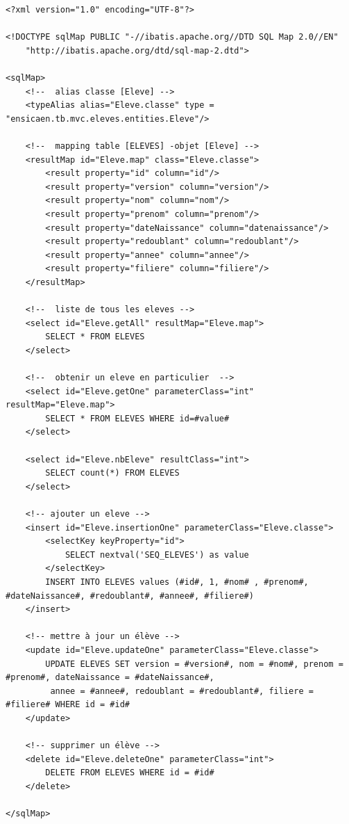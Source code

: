 \documentclass[a4paper,12pt]{article}
\begin{document}
\begin{lstlisting}
<?xml version="1.0" encoding="UTF-8"?>

<!DOCTYPE sqlMap PUBLIC "-//ibatis.apache.org//DTD SQL Map 2.0//EN"
	"http://ibatis.apache.org/dtd/sql-map-2.dtd">
	
<sqlMap>
	<!--  alias classe [Eleve] -->
	<typeAlias alias="Eleve.classe" type = "ensicaen.tb.mvc.eleves.entities.Eleve"/>
	
	<!--  mapping table [ELEVES] -objet [Eleve] -->
	<resultMap id="Eleve.map" class="Eleve.classe">
		<result property="id" column="id"/>
		<result property="version" column="version"/>
		<result property="nom" column="nom"/>
		<result property="prenom" column="prenom"/>
		<result property="dateNaissance" column="datenaissance"/>
		<result property="redoublant" column="redoublant"/>
		<result property="annee" column="annee"/>
		<result property="filiere" column="filiere"/>		
	</resultMap>
	
	<!--  liste de tous les eleves -->
	<select id="Eleve.getAll" resultMap="Eleve.map">
		SELECT * FROM ELEVES
	</select>
	
	<!--  obtenir un eleve en particulier  -->
	<select id="Eleve.getOne" parameterClass="int" resultMap="Eleve.map">
		SELECT * FROM ELEVES WHERE id=#value#
	</select>
	
	<select id="Eleve.nbEleve" resultClass="int">
		SELECT count(*) FROM ELEVES
	</select>
	
	<!-- ajouter un eleve -->
	<insert id="Eleve.insertionOne" parameterClass="Eleve.classe">
		<selectKey keyProperty="id">
			SELECT nextval('SEQ_ELEVES') as value
		</selectKey>
		INSERT INTO ELEVES values (#id#, 1, #nom# , #prenom#, #dateNaissance#, #redoublant#, #annee#, #filiere#)
	</insert>
	
	<!-- mettre à jour un élève -->
	<update id="Eleve.updateOne" parameterClass="Eleve.classe">
		UPDATE ELEVES SET version = #version#, nom = #nom#, prenom = #prenom#, dateNaissance = #dateNaissance#,
		 annee = #annee#, redoublant = #redoublant#, filiere = #filiere# WHERE id = #id#
	</update>
	
	<!-- supprimer un élève -->
	<delete id="Eleve.deleteOne" parameterClass="int">
		DELETE FROM ELEVES WHERE id = #id#
	</delete>

</sqlMap>
\end{lstlisting}
\end{document}
